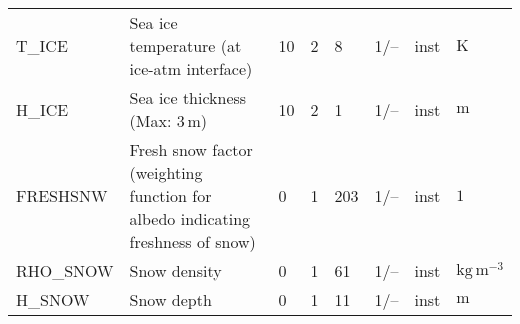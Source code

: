 \begin{longtable}{p{2.0cm}p{5.0cm}p{0.7cm}p{0.7cm}p{0.7cm}p{1.4cm}p{1cm}p{1cm}}
T\_ICE                         &  Sea ice temperature (at ice-atm interface)                                            &              10                                   &                     2                       &                     8                      &                 1/--                            &                      inst                   &        $\mathrm{K}$  \\
H\_ICE                         &  Sea ice thickness (Max: $3\,\mathrm{m}$)                                              &              10                                   &                     2                       &                     1                      &                 1/--                            &                      inst                   &        $\mathrm{m}$  \\
FRESHSNW                       &  Fresh snow factor (weighting function for albedo indicating freshness of snow)        &               0                                   &                     1                       &                   203                      &                 1/--                            &                      inst                   &        $\mathrm{1}$  \\
RHO\_SNOW                      &  Snow density                                                                          &               0                                   &                     1                       &                    61                      &                 1/--                            &                      inst                   &        $\mathrm{kg\,m^{-3}}$  \\
H\_SNOW                        &  Snow depth                                                                            &               0                                   &                     1                       &                    11                      &                 1/--                            &                      inst                   &        $\mathrm{m}$  \\
  \bottomrule
\end{longtable}





